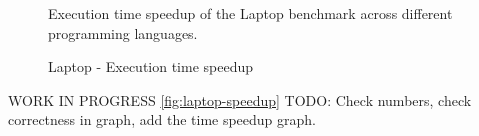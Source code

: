 \begin{figure}
    \caption{Laptop - Execution time speedup}{Execution time speedup of the Laptop benchmark across different programming languages.}
    \label{fig:laptop-time-speedup}
\end{figure}

WORK IN PROGRESS \autoref{fig:laptop-speedup} TODO: Check numbers, check correctness in graph, add the time speedup graph.